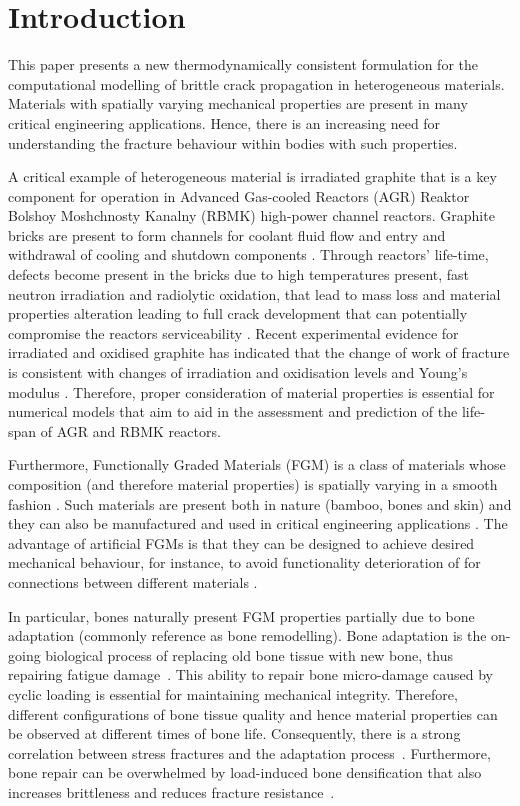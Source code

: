 \documentclass[onecolumn]{svjour3}
\begin{document}

\section{Introduction}


This paper presents a new thermodynamically consistent formulation for the computational modelling of brittle crack propagation in heterogeneous materials. Materials with spatially varying mechanical properties are present in many critical engineering applications. Hence, there is an increasing need for understanding the fracture behaviour within bodies with such properties.

A critical example of heterogeneous material is irradiated graphite that is a key component for operation in Advanced Gas-cooled Reactors (AGR)
Reaktor Bolshoy Moshchnosty Kanalny (RBMK) high-power channel reactors.
Graphite bricks are present to form channels for coolant fluid flow and entry and withdrawal of cooling and shutdown components \cite{Tsang2006, Steer2007}.
Through reactors' life-time, defects become present in the bricks due to high temperatures present, 
fast neutron irradiation and radiolytic oxidation, that lead to mass loss and material properties alteration leading to full crack development that can potentially compromise the reactors serviceability \cite{BrockLehurst1970, Babout2005, McNally2017}.
Recent experimental evidence for irradiated and oxidised graphite has indicated that the change of work of fracture is consistent with changes of irradiation and oxidisation levels and Young's modulus \cite{Tzelepi2018}.
Therefore, proper consideration of material properties is essential for numerical models that aim
to aid in the assessment and prediction of the life-span of AGR and RBMK reactors.

Furthermore, Functionally Graded Materials (FGM) is a class of materials whose composition (and therefore material properties) is spatially varying in a smooth fashion \cite{KawasakiWatanabe1997}.
Such materials are present both in nature (bamboo, bones and skin) and they can also be manufactured and used in critical engineering applications \cite{Jha2013, NaebeShirvan2016}.
The advantage of artificial FGMs is that they can be designed to achieve desired mechanical behaviour, for instance, to avoid functionality deterioration of for connections between different materials \cite{Erdogan1995, FinotSuresh1996}. 

In particular, bones naturally present FGM properties partially due to bone adaptation (commonly reference as bone remodelling).
Bone adaptation is the on-going biological process of replacing old bone tissue with new bone, thus repairing fatigue damage~\cite{hughes2017role}.
This ability to repair bone micro-damage caused by cyclic loading is essential for maintaining mechanical integrity. 
Therefore, different configurations of bone tissue quality and hence material properties can be observed at different times of bone life. 
Consequently, there is a strong correlation between stress fractures and the adaptation process~\cite{hughes2017role}. 
Furthermore, bone repair can be overwhelmed by load-induced bone densification that also increases brittleness and reduces fracture resistance~\cite{loughridge2017qualitative}.
\end{document}
